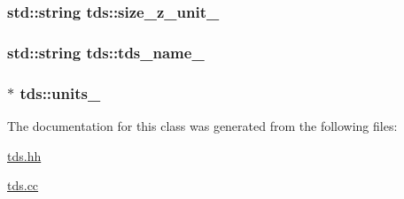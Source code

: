 \subsubsection[{\texorpdfstring{size\+\_\+z\+\_\+unit\+\_\+}{size_z_unit_}}]{\setlength{\rightskip}{0pt plus 5cm}std\+::string tds\+::size\+\_\+z\+\_\+unit\+\_\+\hspace{0.3cm}{\ttfamily [protected]}}\hypertarget{classtds_a01eaf6d0f842d03707ede1d581679665}{}\label{classtds_a01eaf6d0f842d03707ede1d581679665}
\subsubsection[{\texorpdfstring{tds\+\_\+name\+\_\+}{tds_name_}}]{\setlength{\rightskip}{0pt plus 5cm}std\+::string tds\+::tds\+\_\+name\+\_\+\hspace{0.3cm}{\ttfamily [protected]}}\hypertarget{classtds_a81d050e8f4824b068943233983a18c72}{}\label{classtds_a81d050e8f4824b068943233983a18c72}
\subsubsection[{\texorpdfstring{units\+\_\+}{units_}}]{$\ast$ tds\+::units\+\_\+\hspace{0.3cm}{\ttfamily [protected]}}\hypertarget{classtds_a995cf6b41f841a319beee5956ee3092a}{}\label{classtds_a995cf6b41f841a319beee5956ee3092a}


The documentation for this class was generated from the following files\+:\begin{DoxyCompactItemize}
\item 
\hyperlink{tds_8hh}{tds.\+hh}\item 
\hyperlink{tds_8cc}{tds.\+cc}\end{DoxyCompactItemize}
